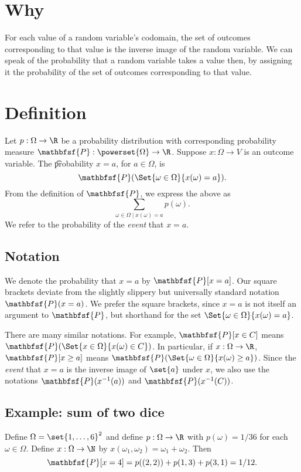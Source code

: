 
\section*{Why}

For each value of a random variable's codomain, the set of outcomes corresponding to that value is the inverse image of the random variable.
We can speak of the probability that a random variable takes a value then, by assigning it the probability of the set of outcomes corresponding to that value.

\section*{Definition}

Let $p: \Omega  \to \R $ be a probability distribution with corresponding probability measure $\mathbfsf{P} : \powerset{\Omega } \to \R $.
Suppose $x: \Omega  \to V$ is an outcome variable.
The \t{probability $x = a$}, for $a \in \Omega $, is
\[
\textstyle
\mathbfsf{P} (\Set{\omega  \in \Omega }{x(\omega ) = a}).
\]
From the definition of $\mathbfsf{P} $, we express the above as
\[
\textstyle
\sum_{\omega  \in \Omega  \mid  x(\omega ) = a} p(\omega ).
\]
We refer to the probability of the \textit{event} that $x = a$.

\subsection*{Notation}

We denote the probability that $x = a$ by $\mathbfsf{P} [x = a]$.
Our square brackets deviate from the slightly slippery but universally standard notation $\mathbfsf{P} (x = a)$.
We prefer the square brackets, since $x=a$ is not itself an argument to $\mathbfsf{P} $, but shorthand for the set $\Set{\omega  \in \Omega }{x(\omega ) = a}$.

There are many similar notations.
For example, $\mathbfsf{P} [x \in C]$ means $\mathbfsf{P} (\Set{x \in \Omega }{x(\omega ) \in C})$.
In particular, if $x: \Omega  \to \R $, $\mathbfsf{P} [x \geq a]$ means $\mathbfsf{P} (\Set{\omega  \in \Omega }{x(\omega ) \geq a})$.
Since the \textit{event} that $x = a$ is the inverse image of $\set{a}$ under $x$, we also use the notations $\mathbfsf{P} (x^{-1}(a))$ and $\mathbfsf{P} (x^{-1}(C))$.

\subsection*{Example: sum of two dice}

Define $\Omega  = \set{1, \dots , 6}^2$ and define $p: \Omega \to \R $ with $p(\omega ) = 1/36$ for each $\omega  \in \Omega $.
Define $x: \Omega  \to \N  $ by $x(\omega _1, \omega _2) = \omega _1 + \omega _2$.
Then
\[
\mathbfsf{P} [x = 4] = p((2, 2)) + p(1, 3) + p(3, 1) = 1/12.
\]
